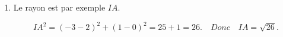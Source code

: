 \documentclass[10pt]{article}
\begin{document}
\begin{enumerate}
		\[
		\begin{cases}
			3x + 2y - 6 = 0 \\
			x - y - 2 = 0
		\end{cases}
		\iff
		\begin{cases}
			3x + 2y - 6 = 0 \\
			x - 2 = y
		\end{cases}
		\iff
		\begin{cases}
			3x + 2(x - 2) - 6 = 0 \\
			x - 2 = y
		\end{cases}
		\iff
		\begin{cases}
			3x + 2x - 4 - 6 = 0 \\
			x - 2 = y
		\end{cases}
		\iff
		\begin{cases}
			5x = 10 \\
			x - 2 = y
		\end{cases}
		\iff
		\begin{cases}
			x = 2 \\
			y = 0
		\end{cases}.
		\]
		
		Les coordonnées de \(I\) sont \((2 ; 0)\).
		
		\item Le rayon est par exemple \(IA\).
		
		\[
		IA^2 = (-3 - 2)^2 + (1 - 0)^2 = 25 + 1 = 26. \quad Donc \quad IA = \sqrt{26}.
		\]
	\end{enumerate}
\end{document}
